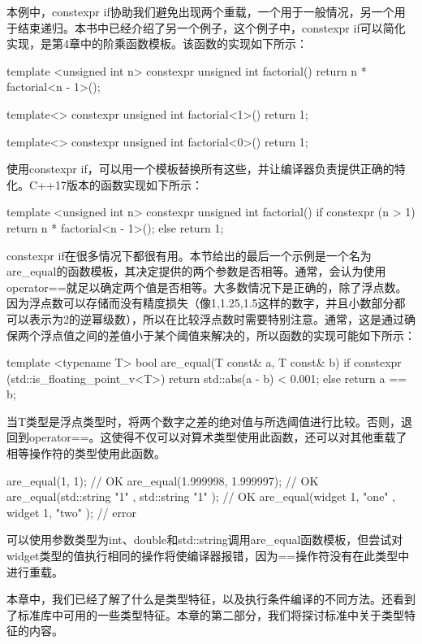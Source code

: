 本例中，constexpr if协助我们避免出现两个重载，一个用于一般情况，另一个用于结束递归。本书中已经介绍了另一个例子，这个例子中，constexpr if可以简化实现，是第4章中的阶乘函数模板。该函数的实现如下所示：

\begin{cpp}
template <unsigned int n>
constexpr unsigned int factorial()
{
	return n * factorial<n - 1>();
}

template<>
constexpr unsigned int factorial<1>() { return 1; }

template<>
constexpr unsigned int factorial<0>() { return 1; }
\end{cpp}

使用constexpr if，可以用一个模板替换所有这些，并让编译器负责提供正确的特化。C++17版本的函数实现如下所示：

\begin{cpp}
template <unsigned int n>
constexpr unsigned int factorial()
{
	if constexpr (n > 1)
		return n * factorial<n - 1>();
	else
		return 1;
}
\end{cpp}

constexpr if在很多情况下都很有用。本节给出的最后一个示例是一个名为are\_equal的函数模板，其决定提供的两个参数是否相等。通常，会认为使用operator==就足以确定两个值是否相等。大多数情况下是正确的，除了浮点数。因为浮点数可以存储而没有精度损失（像1,1.25,1.5这样的数字，并且小数部分都可以表示为2的逆幂级数），所以在比较浮点数时需要特别注意。通常，这是通过确保两个浮点值之间的差值小于某个阈值来解决的，所以函数的实现可能如下所示：

\begin{cpp}
template <typename T>
bool are_equal(T const& a, T const& b)
{
	if constexpr (std::is_floating_point_v<T>)
		return std::abs(a - b) < 0.001;
	else
		return a == b;
}
\end{cpp}

当T类型是浮点类型时，将两个数字之差的绝对值与所选阈值进行比较。否则，退回到operator==。这使得不仅可以对算术类型使用此函数，还可以对其他重载了相等操作符的类型使用此函数。

\begin{cpp}
are_equal(1, 1); // OK
are_equal(1.999998, 1.999997); // OK
are_equal(std::string{ "1" }, std::string{ "1" }); // OK
are_equal(widget{ 1, "one" }, widget{ 1, "two" }); // error
\end{cpp}

可以使用参数类型为int、double和std::string调用are\_equal函数模板，但尝试对widget类型的值执行相同的操作将使编译器报错，因为==操作符没有在此类型中进行重载。

本章中，我们已经了解了什么是类型特征，以及执行条件编译的不同方法。还看到了标准库中可用的一些类型特征。本章的第二部分，我们将探讨标准中关于类型特征的内容。






































